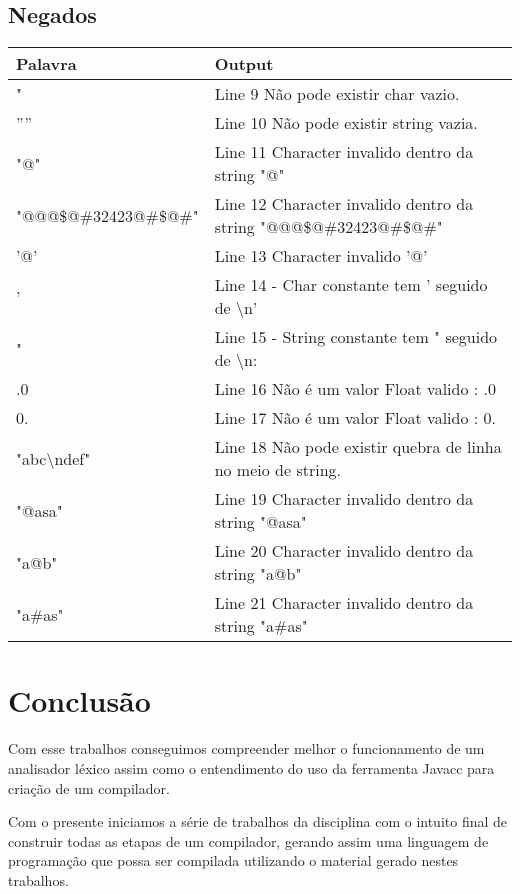 \documentclass[
	article,			%
	11pt,				%
	oneside,			%
	a4paper,			%
	portuguese,			%
	brazil,				%
	sumario=tradicional
	]{abntex2}
\begin{document}
\subsection{Negados}

\begin{center}
\begin{table}[H]
\begin{tabularx}{1\textwidth}{p{5cm}|X}
Palavra & Output \\
\hline
" & Line 9 Não pode existir char vazio. \\
'''' & Line 10 Não pode existir string vazia. \\ 
"@" & Line 11 Character invalido dentro da string "@"\\
"@@@\$@\#32423@\#\$@\#" & Line 12 Character invalido dentro da string "@@@\$@\#32423@\#\$@\#" \\
'@' &  Line 13 Character invalido '@' \\
' &  Line 14 - Char constante tem ' seguido de \textbackslash n' \\
" & Line 15 - String constante tem " seguido de \textbackslash n: \\
.0 & Line 16 Não é um valor Float valido : .0 \\
0. & Line 17 Não é um valor Float valido : 0.\\
"abc\textbackslash ndef" & Line 18 Não pode existir quebra de linha no meio de string. \\
"@asa" & Line 19 Character invalido dentro da string "@asa"\\
"a@b" & Line 20 Character invalido dentro da string "a@b"\\
"a\#as" & Line 21 Character invalido dentro da string "a\#as" \\ \hline
\end{tabularx}
\end{table}
\end{center}

\newpage
\section{Conclusão}

Com esse trabalhos conseguimos compreender melhor o funcionamento de um analisador léxico assim como o entendimento do uso da ferramenta Javacc para criação de um compilador.

Com o presente iniciamos a série de trabalhos da disciplina com o intuito final de construir todas as etapas de um compilador, gerando assim uma linguagem de programação que possa ser compilada utilizando o material gerado nestes trabalhos.

\end{document}
